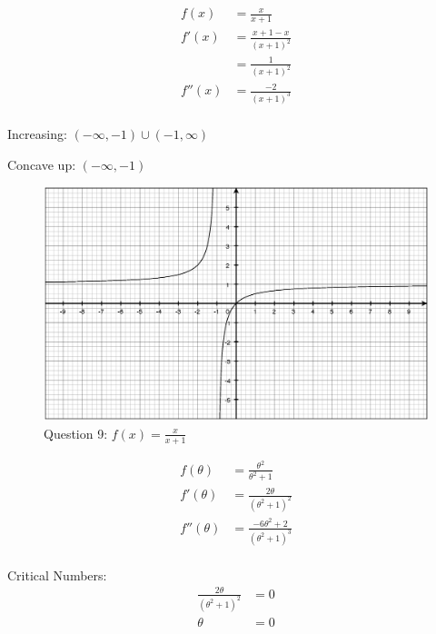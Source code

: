 \documentclass[fleqn]{exam}
\begin{document}
\begin{description}
\pagebreak

\item[9]
\begin{align*}
  f(x) &= \frac{x}{x + 1} \\
  f'(x) &= \frac{x + 1 - x}{(x + 1)^2} \\
        &= \frac{1}{(x + 1)^2} \\
  f''(x) &= \frac{-2}{(x + 1)^3} \\
\end{align*}

\begin{itemize*}
  \item Increasing: $(-\infty, -1) \cup (-1, \infty)$
  \item Concave up: $(-\infty, -1)$
\end{itemize*}

\begin{figure}[H]
  \centering
  \includegraphics[scale=.3]{4.7.9.eps}
  \caption*{Question 9: $f(x) = \frac{x}{x + 1}$}
\end{figure}

\item[12]
\begin{align*}
  f(\theta) &= \frac{\theta^2}{\theta^2 + 1} \\
  f'(\theta) &= \frac{2 \theta}{(\theta^2 + 1)^2} \\
  f''(\theta) &= \frac{-6 \theta^2 + 2}{(\theta^2 + 1)^3} \\
\end{align*}

Critical Numbers:
\begin{align*}
  \frac{2 \theta}{(\theta^2 + 1)^2} &= 0 \\
  \theta &= 0 \\
\end{align*}


\end{description}
\end{document}
